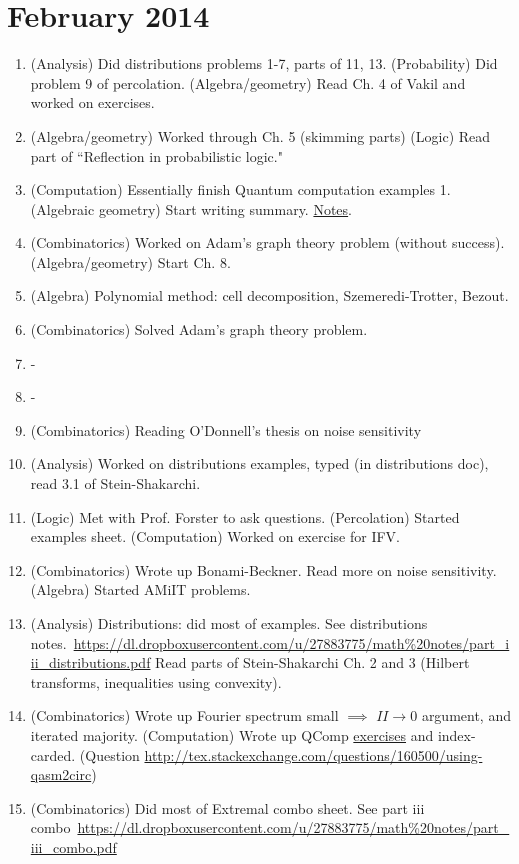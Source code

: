 \section{February 2014}
\begin{enumerate}
\item
(Analysis) Did distributions problems 1-7, parts of 11, 13.
(Probability) Did problem 9 of percolation.
(Algebra/geometry) Read Ch. 4 of Vakil and worked on exercises.
\item
(Algebra/geometry) Worked through Ch. 5 (skimming parts) (Logic) Read part of ``Reflection in probabilistic logic."
\item
(Computation) Essentially finish Quantum computation examples 1. (Algebraic geometry) Start writing summary. \hyperlink{geo/ag/summary}{Notes}.
\item
(Combinatorics) Worked on Adam's graph theory problem (without success). (Algebra/geometry) Start Ch. 8.
\item
(Algebra) Polynomial method: cell decomposition, Szemeredi-Trotter, Bezout.
\item
(Combinatorics) Solved Adam's graph theory problem.
\item -
\item -
\item (Combinatorics) Reading O'Donnell's thesis on noise sensitivity
\item (Analysis) Worked on distributions examples, typed (in distributions doc), read 3.1 of Stein-Shakarchi.
\item (Logic) Met with Prof. Forster to ask questions. (Percolation) Started examples sheet. (Computation) Worked on exercise for IFV.
\item (Combinatorics) Wrote up Bonami-Beckner. Read more on noise sensitivity. (Algebra) Started AMiIT problems.
\item (Analysis) Distributions: did most of examples. See distributions notes.~\url{https://dl.dropboxusercontent.com/u/27883775/math\%20notes/part_iii_distributions.pdf}
Read parts of Stein-Shakarchi Ch. 2 and 3 (Hilbert transforms, inequalities using convexity).
\item (Combinatorics) Wrote up Fourier spectrum small $\implies$ $II\to 0$ argument, and iterated majority. (Computation) Wrote up QComp \hyperlink{comp/qc/ex1}{exercises} and index-carded. (Question \url{http://tex.stackexchange.com/questions/160500/using-qasm2circ})
\item (Combinatorics) Did most of Extremal combo sheet. See part iii combo~\url{https://dl.dropboxusercontent.com/u/27883775/math\%20notes/part_iii_combo.pdf}

\end{enumerate}
